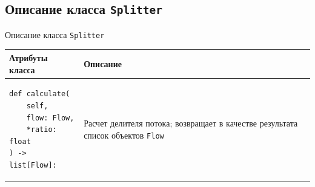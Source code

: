 \documentclass[aspectratio=169, mathserif]{beamer}%
\begin{document}
\subsection{Описание класса \texttt{Splitter}}
\begin{frame}[fragile]{Описание класса \texttt{Splitter}}
\scriptsize
\vfill
\begin{table}[h!]
	\centering
	\renewcommand{\arraystretch}{1.2}
	\begin{tabular}{|p{.49\linewidth}|p{.49\linewidth}|}
		\hline
		\textbf{Атрибуты класса} & \textbf{Описание}  \\
		\hline
\begin{minipage}{\linewidth}
\vfill
\begin{verbatim}
def calculate(
    self,
    flow: Flow,
    *ratio: float
) -> list[Flow]:
\end{verbatim}
\vfill
\end{minipage}
		& Расчет делителя потока; возвращает в качестве результата список объектов \texttt{Flow} \\
		\hline
	\end{tabular}
\end{table}
\vfill
\end{frame}

\end{document}

